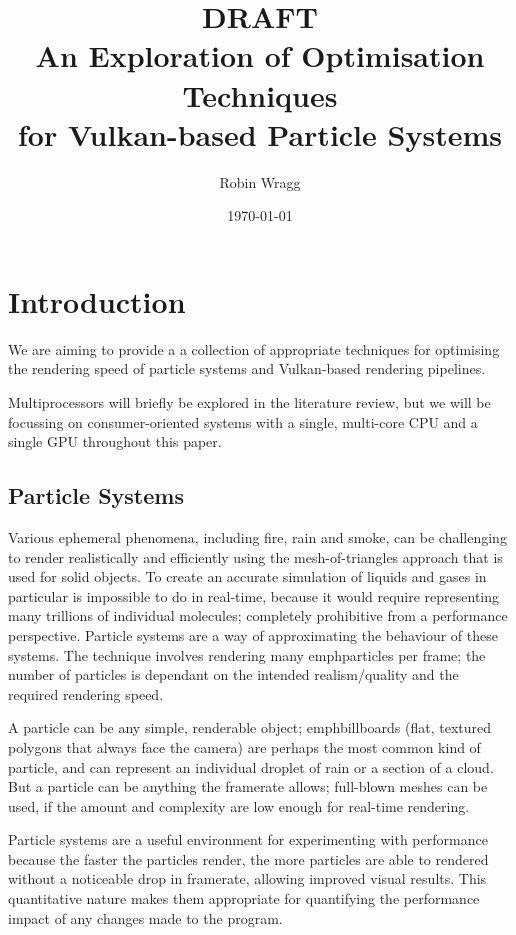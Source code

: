 \documentclass[11pt, a4paper, twocolumn]{article}
\title{\sffamily\bfseries DRAFT\\An Exploration of Optimisation Techniques\\for Vulkan-based Particle Systems}
\author{Robin Wragg}
\date{\today}
\begin{document}
\maketitle

\section{Introduction}

We are aiming to provide a a collection of appropriate techniques for optimising the rendering speed of particle systems and Vulkan-based rendering pipelines.

Multiprocessors will briefly be explored in the literature review, but we will be focussing on consumer-oriented systems with a single, multi-core CPU and a single GPU throughout this paper.

\subsection{Particle Systems}

Various ephemeral phenomena, including fire, rain and smoke, can be challenging to render realistically and efficiently using the mesh-of-triangles approach that is used for solid objects. To create an accurate simulation of liquids and gases in particular is impossible to do in real-time, because it would require representing many trillions of individual molecules; completely prohibitive from a performance perspective. Particle systems are a way of approximating the behaviour of these systems. The technique involves rendering many emph{particles} per frame; the number of particles is dependant on the intended realism/quality and the required rendering speed.

A particle can be any simple, renderable object; emph{billboards} (flat, textured polygons that always face the camera) are perhaps the most common kind of particle, and can represent an individual droplet of rain or a section of a cloud. But a particle can be anything the framerate allows; full-blown meshes can be used, if the amount and complexity are low enough for real-time rendering.

Particle systems are a useful environment for experimenting with performance because the faster the particles render, the more particles are able to rendered without a noticeable drop in framerate, allowing improved visual results. This quantitative nature makes them appropriate for quantifying the performance impact of any changes made to the program.
\end{document}
